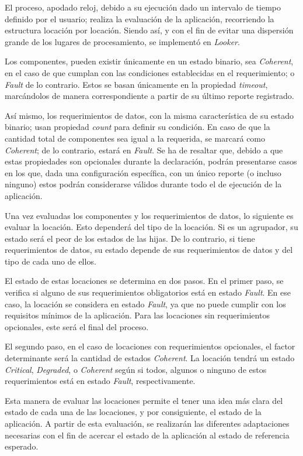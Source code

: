 El proceso, apodado reloj, debido a su ejecución dado un intervalo de tiempo definido por el usuario; realiza la evaluación de la aplicación, recorriendo la estructura locación por locación. Siendo así, y con el fin de evitar una dispersión grande de los lugares de procesamiento, se implementó en \textit{Looker}.

Los componentes, pueden existir únicamente en un estado binario, sea \textit{Coherent}, en el caso de que cumplan con las condiciones establecidas en el requerimiento; o \textit{Fault} de lo contrario. Estos se basan únicamente en la propiedad \textit{timeout}, marcándolos de manera correspondiente a partir de su último reporte registrado. 

Así mismo, los requerimientos de datos, con la misma característica de su estado binario; usan propiedad \textit{count} para definir su condición. En caso de que la cantidad total de componentes sea igual a la requerida, se marcará como \textit{Coherent}; de lo contrario, estará en \textit{Fault}. Se ha de resaltar que, debido a que estas propiedades son opcionales durante la declaración, podrán presentarse casos en los que, dada una configuración específica, con un único reporte (o incluso ninguno) estos podrán considerarse válidos durante todo el de ejecución de la aplicación.

Una vez evaluadas los componentes y los requerimientos de datos, lo siguiente es evaluar la locación. Esto dependerá del tipo de la locación. Si es un agrupador, su estado será el peor de los estados de las hijas. De lo contrario, si tiene requerimientos de datos, su estado depende de sus requerimientos de datos y del tipo de cada uno de ellos.

El estado de estas locaciones se determina en dos pasos. En el primer paso, se verifica si alguno de sus requerimientos obligatorios está en estado \textit{Fault}. En ese caso, la locación se considera en estado \textit{Fault}, ya que no puede cumplir con los requisitos mínimos de la aplicación. Para las locaciones sin requerimientos opcionales, este será el final del proceso.

El segundo paso, en el caso de locaciones con requerimientos opcionales, el factor determinante será la cantidad de estados \textit{Coherent}. La locación tendrá un estado \textit{Critical}, \textit{Degraded}, o \textit{Coherent} según si todos, algunos o ninguno de estos requerimientos está en estado \textit{Fault}, respectivamente.

Esta manera de evaluar las locaciones permite el tener una idea más clara del estado de cada una de las locaciones, y por consiguiente, el estado de la aplicación. A partir de esta evaluación, se realizarán las diferentes adaptaciones necesarias con el fin de acercar el estado de la aplicación al estado de referencia esperado.

